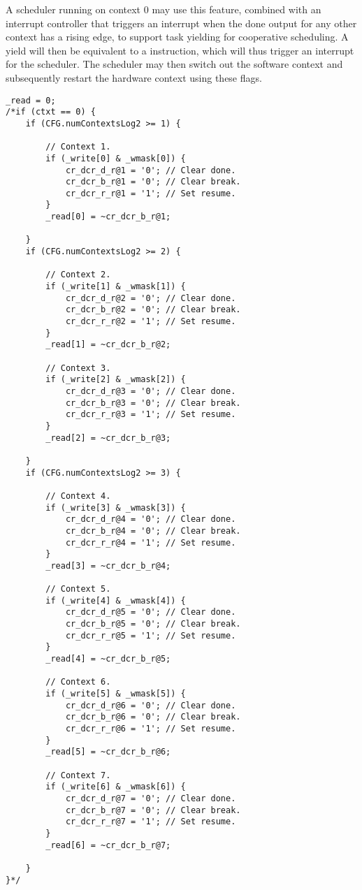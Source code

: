 A scheduler running on context 0 may use this feature, combined with an
interrupt controller that triggers an interrupt when the done output for any
other context has a rising edge, to support task yielding for cooperative
scheduling. A yield will then be equivalent to a  instruction, which
will thus trigger an interrupt for the scheduler. The scheduler may then
switch out the software context and subsequently restart the hardware context
using these flags.

\implementation{}
\begin{lstlisting}
_read = 0;
/*if (ctxt == 0) {
    if (CFG.numContextsLog2 >= 1) {
        
        // Context 1.
        if (_write[0] & _wmask[0]) {
            cr_dcr_d_r@1 = '0'; // Clear done.
            cr_dcr_b_r@1 = '0'; // Clear break.
            cr_dcr_r_r@1 = '1'; // Set resume.
        }
        _read[0] = ~cr_dcr_b_r@1;
        
    }
    if (CFG.numContextsLog2 >= 2) {
        
        // Context 2.
        if (_write[1] & _wmask[1]) {
            cr_dcr_d_r@2 = '0'; // Clear done.
            cr_dcr_b_r@2 = '0'; // Clear break.
            cr_dcr_r_r@2 = '1'; // Set resume.
        }
        _read[1] = ~cr_dcr_b_r@2;
        
        // Context 3.
        if (_write[2] & _wmask[2]) {
            cr_dcr_d_r@3 = '0'; // Clear done.
            cr_dcr_b_r@3 = '0'; // Clear break.
            cr_dcr_r_r@3 = '1'; // Set resume.
        }
        _read[2] = ~cr_dcr_b_r@3;
        
    }
    if (CFG.numContextsLog2 >= 3) {
        
        // Context 4.
        if (_write[3] & _wmask[3]) {
            cr_dcr_d_r@4 = '0'; // Clear done.
            cr_dcr_b_r@4 = '0'; // Clear break.
            cr_dcr_r_r@4 = '1'; // Set resume.
        }
        _read[3] = ~cr_dcr_b_r@4;
        
        // Context 5.
        if (_write[4] & _wmask[4]) {
            cr_dcr_d_r@5 = '0'; // Clear done.
            cr_dcr_b_r@5 = '0'; // Clear break.
            cr_dcr_r_r@5 = '1'; // Set resume.
        }
        _read[4] = ~cr_dcr_b_r@5;
        
        // Context 6.
        if (_write[5] & _wmask[5]) {
            cr_dcr_d_r@6 = '0'; // Clear done.
            cr_dcr_b_r@6 = '0'; // Clear break.
            cr_dcr_r_r@6 = '1'; // Set resume.
        }
        _read[5] = ~cr_dcr_b_r@6;
        
        // Context 7.
        if (_write[6] & _wmask[6]) {
            cr_dcr_d_r@7 = '0'; // Clear done.
            cr_dcr_b_r@7 = '0'; // Clear break.
            cr_dcr_r_r@7 = '1'; // Set resume.
        }
        _read[6] = ~cr_dcr_b_r@7;
        
    }
}*/
\end{lstlisting}

